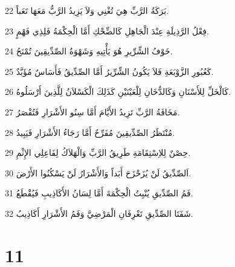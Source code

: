 \par 22 بَرَكَةُ الرَّبِّ هِيَ تُغْنِي وَلاَ يَزِيدُ الرَّبُّ مَعَهَا تَعَباً.
\par 23 فِعْلُ الرَّذِيلَةِ عِنْدَ الْجَاهِلِ كَالضِّحْكِ أَمَّا الْحِكْمَةُ فَلِذِي فَهْمٍ.
\par 24 خَوْفُ الشِّرِّيرِ هُوَ يَأْتِيهِ وَشَهْوَةُ الصِّدِّيقِينَ تُمْنَحُ.
\par 25 كَعُبُورِ الزَّوْبَعَةِ فَلاَ يَكُونُ الشِّرِّيرُ أَمَّا الصِّدِّيقُ فَأَسَاسٌ مُؤَبَّدٌ.
\par 26 كَالْخَلِّ لِلأَسْنَانِ وَكَالدُّخَانِ لِلْعَيْنَيْنِ كَذَلِكَ الْكَسْلاَنُ لِلَّذِينَ أَرْسَلُوهُ.
\par 27 مَخَافَةُ الرَّبِّ تَزِيدُ الأَيَّامَ أَمَّا سِنُو الأَشْرَارِ فَتُقْصَرُ.
\par 28 مُنْتَظَرُ الصِّدِّيقِينَ مُفَرِّحٌ أَمَّا رَجَاءُ الأَشْرَارِ فَيَبِيدُ.
\par 29 حِصْنٌ لِلاِسْتِقَامَةِ طَرِيقُ الرَّبِّ وَالْهَلاَكُ لِفَاعِلِي الإِثْمِ.
\par 30 اَلصِّدِّيقُ لَنْ يُزَحْزَحَ أَبَداً وَالأَشْرَارُ لَنْ يَسْكُنُوا الأَرْضَ.
\par 31 فَمُ الصِّدِّيقِ يُنْبِتُ الْحِكْمَةَ أَمَّا لِسَانُ الأَكَاذِيبِ فَيُقْطَعُ.
\par 32 شَفَتَا الصِّدِّيقِ تَعْرِفَانِ الْمَرْضِيَّ وَفَمُ الأَشْرَارِ أَكَاذِيبُ.

\chapter{11}

